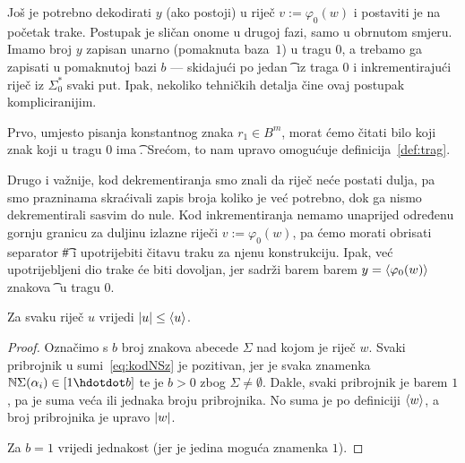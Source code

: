 
Još je potrebno dekodirati $y$ (ako postoji) u riječ $v:=\varphi_0(w)$ i postaviti je na početak trake.
Postupak je sličan onome u drugoj fazi, samo u obrnutom smjeru. Imamo broj $y$ zapisan unarno (pomaknuta baza~$1$) u tragu $0$, a trebamo ga zapisati u pomaknutoj bazi $b$ --- skidajući po jedan \t\textbullet\ iz traga $0$ i inkrementirajući riječ iz $\Sigma_0^*$ svaki put. Ipak, nekoliko tehničkih detalja čine ovaj postupak kompliciranijim.

Prvo, umjesto pisanja konstantnog znaka $r_1\in B^m$, morat ćemo čitati bilo koji znak koji u tragu $0$ ima \t\textbullet. Srećom, to nam upravo omogućuje definicija~\ref{def:trag}.

Drugo i važnije, kod dekrementiranja smo znali da riječ neće postati dulja, pa smo prazninama skraćivali zapis broja koliko je već potrebno, dok ga nismo dekrementirali sasvim do nule. Kod inkrementiranja nemamo unaprijed određenu gornju granicu za duljinu izlazne riječi $v:=\varphi_0(w)$, pa ćemo morati obrisati separator \t\# i upotrijebiti čitavu traku za njenu konstrukciju. Ipak, već upotrijebljeni dio trake će biti dovoljan, jer sadrži barem barem $y=\langle\varphi_0(w)\rangle$ znakova \t\textbullet\ u tragu $0$.

\begin{lema}[{name=[duljina riječi nije veća od koda riječi]}]\label{lm:dulj<=kr}
Za svaku riječ $u$ vrijedi $\lvert u\rvert\le\langle u\rangle$.
\end{lema}
\begin{proof}
Označimo s $b$ broj znakova abecede $\Sigma$ nad kojom je riječ $w$.
Svaki pribrojnik u sumi~\eqref{eq:kodNSz} je pozitivan, jer je svaka znamenka $\N\Sigma(\alpha_i)\in[1\dd b]$ te je $b>0$ zbog $\Sigma\ne\emptyset$. Dakle, svaki pribrojnik je barem $1$, pa je suma veća ili jednaka broju pribrojnika. No suma je po definiciji $\langle w\rangle$, a broj pribrojnika je upravo $\lvert w\rvert$.

Za $b=1$ vrijedi jednakost (jer je jedina moguća znamenka $1$).
\end{proof}

